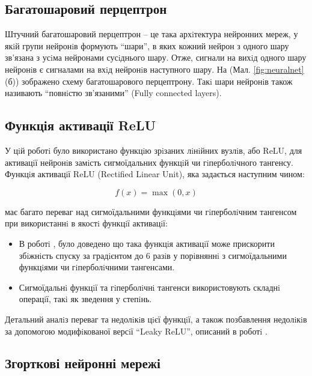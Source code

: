 \subsection{Багатошаровий перцептрон}

Штучний багатошаровий перцептрон -- це така архiтектура нейронних мереж, у якiй групи нейронiв формують \enquote{шари}, в яких кожний нейрон з одного шару зв'язана з усiма нейронами сусiднього шару. Отже, сигнали на вихiд одного шару нейронiв є сигналами на вхiд нейронiв наступного шару. На (Мал. \ref{fig:neuralnet} (б)) зображено схему багатошарового перцептрону. Такi шари нейронiв також називають \enquote{повнiстю зв'язаними} (Fully connected layers).

\subsection{Функція активації ReLU}

У цiй роботi було використано функцiю зрiзаних лiнiйних вузлiв, або ReLU, для активацiї нейронiв замiсть сигмоїдальних функцiй чи гiперболiчного тангенсу. Функцiя активацiї ReLU (Rectified Linear Unit), яка задається наступним чином:

\begin{equation*}
f(x) = \max(0, x)
\end{equation*}

має багато переваг над сигмоїдальними функцiями чи гiперболiчним тангенсом при використаннi в якостi функцiї активацiї:

\begin{itemize}
	\item В роботi \parencite{nn:krizhevsky_imagenet}, було доведено що така функцiя активацiї може прискорити збiжнiсть спуску за градiєнтом до 6 разiв у порiвняннi з сигмоїдальними функцiями чи гiперболiчними тангенсами.
	
	\item Сигмоїдальнi функцiї та гiперболiчнi тангенси використовують складнi операцiї, такi як зведення у степiнь.
\end{itemize}

Детальний аналiз переваг та недолiкiв цiєї функцiї, а також позбавлення недолiкiв за допомогою модифiкованої версiї \enquote{Leaky ReLU}, описаний в роботi \parencite{nn:kaiming}.


\subsection{Згорткові нейронні мережі}

